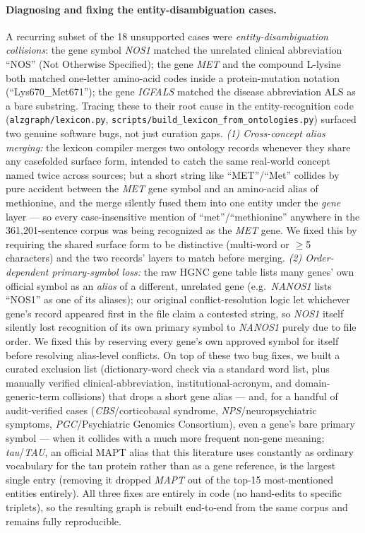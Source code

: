 \documentclass{article}
\begin{document}
\paragraph{Diagnosing and fixing the entity-disambiguation cases.} A recurring subset of the 18 unsupported cases were \emph{entity-disambiguation collisions}: the gene symbol \textit{NOS1} matched the unrelated clinical abbreviation ``NOS'' (Not Otherwise Specified); the gene \textit{MET} and the compound L-lysine both matched one-letter amino-acid codes inside a protein-mutation notation (``Lys670\_Met671''); the gene \textit{IGFALS} matched the disease abbreviation ALS as a bare substring. Tracing these to their root cause in the entity-recognition code (\texttt{alzgraph/lexicon.py}, \texttt{scripts/build\_lexicon\_from\_ontologies.py}) surfaced two genuine software bugs, not just curation gaps. \emph{(1) Cross-concept alias merging:} the lexicon compiler merges two ontology records whenever they share any casefolded surface form, intended to catch the same real-world concept named twice across sources; but a short string like ``MET''/``Met'' collides by pure accident between the \textit{MET} gene symbol and an amino-acid alias of methionine, and the merge silently fused them into one entity under the \emph{gene} layer --- so every case-insensitive mention of ``met''/``methionine'' anywhere in the 361{,}201-sentence corpus was being recognized as the \textit{MET} gene. We fixed this by requiring the shared surface form to be distinctive (multi-word or $\geq$5 characters) and the two records' layers to match before merging. \emph{(2) Order-dependent primary-symbol loss:} the raw HGNC gene table lists many genes' own official symbol as an \emph{alias} of a different, unrelated gene (e.g.\ \textit{NANOS1} lists ``NOS1'' as one of its aliases); our original conflict-resolution logic let whichever gene's record appeared first in the file claim a contested string, so \textit{NOS1} itself silently lost recognition of its own primary symbol to \textit{NANOS1} purely due to file order. We fixed this by reserving every gene's own approved symbol for itself before resolving alias-level conflicts. On top of these two bug fixes, we built a curated exclusion list (dictionary-word check via a standard word list, plus manually verified clinical-abbreviation, institutional-acronym, and domain-generic-term collisions) that drops a short gene alias --- and, for a handful of audit-verified cases (\textit{CBS}/corticobasal syndrome, \textit{NPS}/neuropsychiatric symptoms, \textit{PGC}/Psychiatric Genomics Consortium), even a gene's bare primary symbol --- when it collides with a much more frequent non-gene meaning; \textit{tau}/\textit{TAU}, an official MAPT alias that this literature uses constantly as ordinary vocabulary for the tau protein rather than as a gene reference, is the largest single entry (removing it dropped \textit{MAPT} out of the top-15 most-mentioned entities entirely). All three fixes are entirely in code (no hand-edits to specific triplets), so the resulting graph is rebuilt end-to-end from the same corpus and remains fully reproducible.
\end{document}
